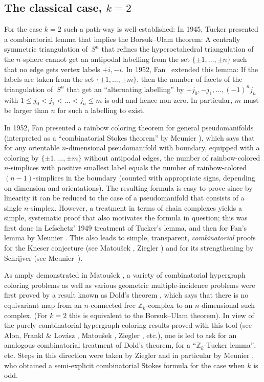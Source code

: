 \documentclass[11pt,a4paper,draft]{article}
\newcommand{\Z}{{\mathbb Z}}
\theoremstyle{definition}
\begin{document}
\subsection{The classical case, \boldmath$k=2$}

For the case $k=2$ such a path-way is well-established:
In 1945, Tucker \cite{Tucker} presented a combinatorial lemma that
implies the Borsuk--Ulam theorem: A centrally symmetric triangulation of~$S^n$
that refines the hyperoctahedral triangulation of the $n$-sphere cannot get an
antipodal labelling from the set $\{\pm1,\dots,\pm n\}$ such that no edge gets
vertex labels $+i,-i$.  In 1952, Fan~\cite{fan52} extended this lemma: If
the labels are taken from the set $\{\pm1,\dots,\pm m\}$, then the number of
facets of the triangulation of~$S^n$ that get an ``alternating labelling'' by
$+j_0,-j_1,\ldots,(-1)^nj_n$ with $1\le j_0<j_1<\dots<j_n\le m$ is odd and
hence non-zero. In particular, $m$ must be larger than $n$ for such a
labelling to exist.

In 1952, Fan \cite{fan67} presented a rainbow coloring theorem for general
pseudomanifolds (interpreted as a ``combinatorial Stokes theorem'' by Meunier
\cite{meunier06:_spern}), which says that for any orientable $n$-dimensional
pseudomanifold with boundary, equipped with a coloring by $\{\pm1,\dots,\pm
m\}$ without antipodal edges, the number of rainbow-colored $n$-simplices with
positive smallest label equals the number of rainbow-colored $(n-1)$-simplices
in the boundary (counted with appropriate signs, depending on dimension and
orientations).  The resulting formula is easy to prove since by linearity it
can be reduced to the case of a pseudomanifold that consists of a single
$n$-simplex. However, a treatment in terms of chain complexes yields a
simple, systematic
proof that also motivates the formula in question; this was first done in
Lefschetz' 1949 treatment \cite[Sect.~IV\S7, pp.~134--140]{Lefschetz-intro} of
Tucker's lemma, and then for Fan's lemma by Meunier \cite{meunier06:_spern}.
This also leads to simple, transparent, \emph{combinatorial} proofs for the
Kneser conjecture (see Matou\v{s}ek \cite{Mat1}, Ziegler \cite{Z77}) and for
its strengthening by Schrijver \cite{Schrijver-kneser} (see
Meunier~\cite{meunier06:_spern}).%

As amply demonstrated in Matou\v{s}ek \cite{Matousek:BU}, a variety of
combinatorial hypergraph coloring problems as well as various geometric
multiple-incidence problems were first proved by a result known as Dold's
theorem \cite{Dold}, which says that there is no equivariant map from an
$n$-connected free $\Z_k$-complex to an $n$-dimensional such complex. (For
$k=2$ this is equivalent to the Borsuk--Ulam theorem). In view of the purely
combinatorial hypergraph coloring results proved with this tool (see Alon,
Frankl \& Lov\'asz \cite{AlonFranklLovasz}, Matou\v{s}ek \cite{Mat2}, Ziegler
\cite{Z77}, etc.), one is led to ask for an analogous combinatorial treatment
of Dold's theorem, for a ``$\Z_k$-Tucker lemma'', etc.
Steps in this direction were taken by Ziegler \cite{Z77} and in particular by
Meunier \cite{meunier:_z_fan05}, who obtained a semi-explicit
combinatorial Stokes formula for the case when $k$ is odd.
\end{document}
